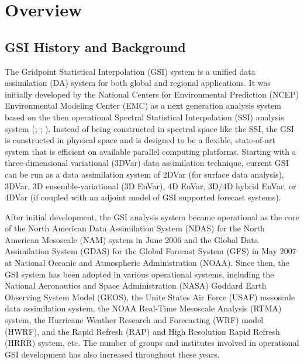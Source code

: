 \chapter{Overview}

\section{GSI History and Background}

The Gridpoint Statistical Interpolation (GSI) system is a unified data assimilation (DA) system for both global and regional applications. It was initially developed by the National Centers for Environmental Prediction (NCEP) Environmental Modeling Center (EMC) as a next generation analysis system based on the then operational Spectral Statistical Interpolation (SSI) analysis system (\cite{Wu2002}; \cite{Purser2003a}; \cite{Purser2003b}). Instead of being constructed in spectral space like the SSI, the GSI is constructed in physical space and is designed to be a flexible, state-of-art system that is efficient on available parallel computing platforms. Starting with a three-dimensional variational (3DVar) data assimilation technique, current GSI can be run as a data assimilation system of 2DVar (for surface data analysis), 3DVar, 3D ensemble-variational (3D EnVar),  4D EnVar, 3D/4D hybrid EnVar, or 4DVar (if coupled with an adjoint model of GSI supported forecast systems).

After initial development, the GSI analysis system became operational as the core of the North American Data Assimilation System (NDAS) for the North American Mesoscale (NAM) system in June 2006 and the Global Data Assimilation System (GDAS) for the Global Forecast System (GFS) in May 2007 at National Oceanic and Atmospheric Administration (NOAA). Since then, the GSI system has been adopted in various operational systems, including the National Aeronautics and Space Administration (NASA) Goddard Earth Observing System Model (GEOS), the Unite States Air Force (USAF) mesoscale data assimilation system, the NOAA Real-Time Mesoscale Analysis (RTMA) system, the Hurricane Weather Research and Forecasting (WRF) model (HWRF), and the Rapid Refresh (RAP) and High Resolution Rapid Refresh (HRRR) system, etc. The number of groups and institutes involved in operational GSI development has also increased throughout these years.

